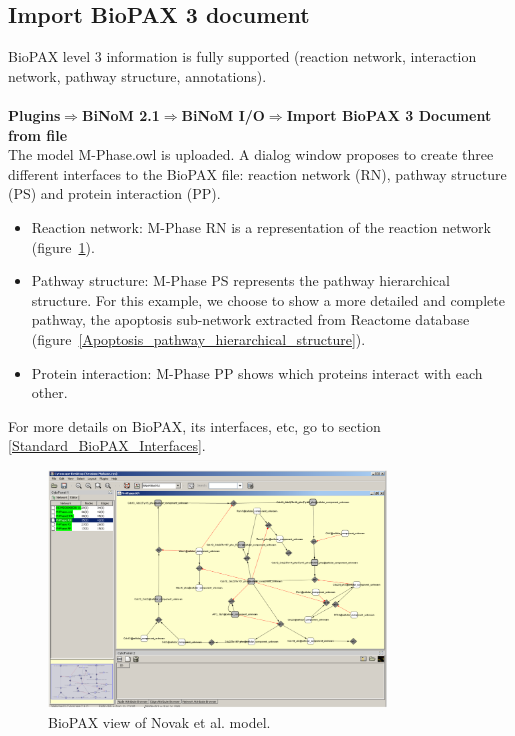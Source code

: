 \subsection{Import BioPAX 3 document}
BioPAX level 3 information is fully supported (reaction network, interaction network, pathway structure, annotations).\\\\
\textbf{Plugins$\Rightarrow$BiNoM 2.1$\Rightarrow$BiNoM  I/O$\Rightarrow$Import BioPAX 3 Document from file}\\
The model M-Phase.owl\cite{novak1998model} is uploaded. A dialog window proposes to create three different interfaces to the BioPAX file: reaction network (RN), pathway structure (PS) and protein interaction (PP).
\begin{itemize}
\item Reaction network: M-Phase RN is a representation of the reaction network (figure~\ref{View_BioPAX_of_Novak}).
\item Pathway structure: M-Phase PS represents the pathway hierarchical structure. For this example, we choose to show a more detailed and complete pathway, the apoptosis sub-network extracted from Reactome database (figure~\ref{Apoptosis_pathway_hierarchical_structure}).
\item Protein interaction: M-Phase PP shows which proteins interact with each other.
\end{itemize}
For more details on BioPAX, its interfaces, etc, go to section \ref{Standard_BioPAX_Interfaces}.
\begin{figure}
\centering
\includegraphics[width=0.8\textwidth]{graphics/View_BioPAX_of_Novak}
\caption{BioPAX view of Novak et al. model.}
\label{View_BioPAX_of_Novak}
\end{figure}
